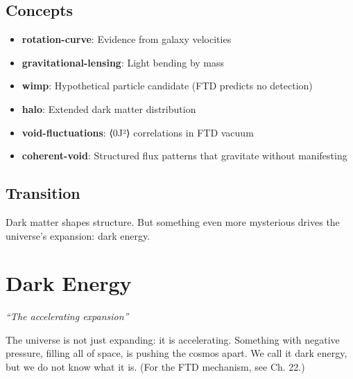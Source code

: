 \documentclass[
  11pt,
  letterpaper,
  twoside,
  openright]{book}
\providecommand{\tightlist}{%
  \setlength{\itemsep}{0pt}\setlength{\parskip}{0pt}}
\begin{document}
\section{Concepts}\label{concepts-29}

\begin{itemize}
\tightlist
\item
  \textbf{rotation-curve}: Evidence from galaxy velocities
\item
  \textbf{gravitational-lensing}: Light bending by mass
\item
  \textbf{wimp}: Hypothetical particle candidate (FTD predicts no
  detection)
\item
  \textbf{halo}: Extended dark matter distribution
\item
  \textbf{void-fluctuations}: ⟨0\textbar J²⟩ correlations in
  FTD vacuum
\item
  \textbf{coherent-void}: Structured flux patterns that gravitate
  without manifesting
\end{itemize}

\section{Transition}\label{transition-29}

Dark matter shapes structure. But something even more mysterious drives
the universe's expansion: dark energy.

\chapter{Dark Energy}\label{sec-dark-energy}

\emph{``The accelerating expansion''}

\begin{tcolorbox}[enhanced jigsaw, coltitle=black, colbacktitle=quarto-callout-note-color!10!white, toprule=.15mm, colframe=quarto-callout-note-color-frame, arc=.35mm, opacityback=0, bottomtitle=1mm, toptitle=1mm, breakable, colback=white, titlerule=0mm, opacitybacktitle=0.6, title=\textcolor{quarto-callout-note-color}{\faInfo}\hspace{0.5em}{Key Revelation}, rightrule=.15mm, bottomrule=.15mm, leftrule=.75mm, left=2mm]

The universe is not just expanding: it is accelerating. Something with
negative pressure, filling all of space, is pushing the cosmos apart. We
call it dark energy, but we do not know what it is. (For the FTD
mechanism, see Ch. 22.)

\end{tcolorbox}
\end{document}
